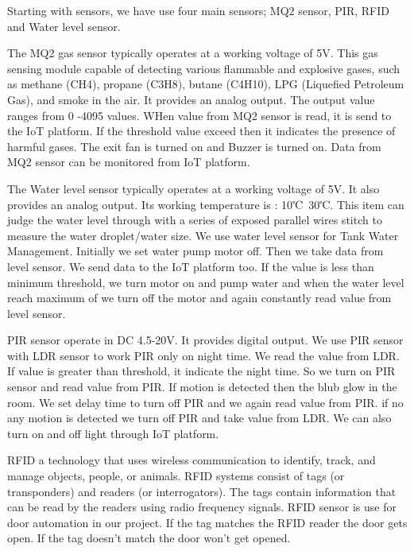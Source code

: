 \documentclass[12pt,a4paper]{report}
\begin{document}
	\begin{justify}
		
		Starting with sensors, we have use four main sensors; MQ2 sensor, PIR, RFID and Water level sensor.
		
	\end{justify}
	\begin{justify}
		
		
		The MQ2 gas sensor typically operates at a working voltage of 5V. This  gas sensing module capable of detecting various flammable and explosive gases, such as methane (CH4), propane (C3H8), butane (C4H10), LPG (Liquefied Petroleum Gas), and smoke in the air. It provides an analog output. The output value ranges from 0 -4095 values. WHen value from MQ2 sensor is read, it is send to the IoT platform. If the threshold value exceed  then  it indicates the presence of harmful gases. The exit fan is turned on  and Buzzer is turned on. Data from MQ2 sensor can be monitored from IoT platform.
	\end{justify}
	\begin{justify}
		The Water level sensor typically operates at a working voltage of 5V. It also  provides an analog output. Its working temperature is : 10℃~30℃.  This item can judge the water level through with a series of exposed parallel wires stitch to measure the water droplet/water size.  We use water level sensor for  Tank Water Management. Initially we set water pump motor off. Then we take data from level sensor. We send data to the IoT platform too. If the value is less than minimum threshold, we turn motor on and pump water and when the water level reach maximum of we turn off the motor and again constantly  read value from level sensor. 
	\end{justify}
	\begin{justify}
		
		PIR sensor operate in DC 4.5-20V. It provides digital output. We use PIR sensor with LDR sensor to work PIR only on night time. We read the value from LDR. If value is greater than  threshold, it indicate the night time. So we turn on PIR sensor and read value from PIR. If motion is detected then the blub glow in the room. We set delay time to turn off PIR and we again read value from PIR. if no any motion is detected we turn off PIR and take value from LDR. We can also turn on and off light through IoT platform.
	
	\end{justify}
	\begin{justify}
		
		RFID a technology that uses wireless communication to identify, track, and manage objects, people, or animals. RFID systems consist of tags (or transponders) and readers (or interrogators). The tags contain information that can be read by the readers using radio frequency signals. RFID sensor is use for door automation in our project. If the tag matches the RFID reader the door gets open. If the tag doesn't match the door won't get opened.
		
		
	\end{justify}\
	
\end{document}
